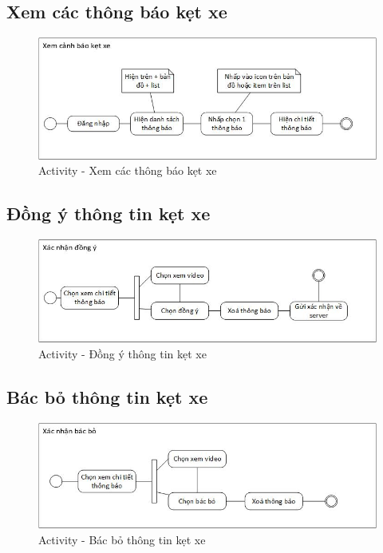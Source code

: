 	\subsection{Xem các thông báo kẹt xe}
		\begin{figure}[H]
			\centering
			\includegraphics[scale=.75]{Graphics/activity-viewnoti}
			\caption{Activity - Xem các thông báo kẹt xe}
		\end{figure}
	
	\subsection{Đồng ý thông tin kẹt xe} 
		\begin{figure}[H]
			\centering
			\includegraphics[scale=.75]{Graphics/activity-approve}
			\caption{Activity - Đồng ý thông tin kẹt xe}
		\end{figure}
	
	\subsection{Bác bỏ thông tin kẹt xe}
		\begin{figure}[H]
			\centering
			\includegraphics[scale=.75]{Graphics/activity-reject}
			\caption{Activity - Bác bỏ thông tin kẹt xe}
		\end{figure}
	
